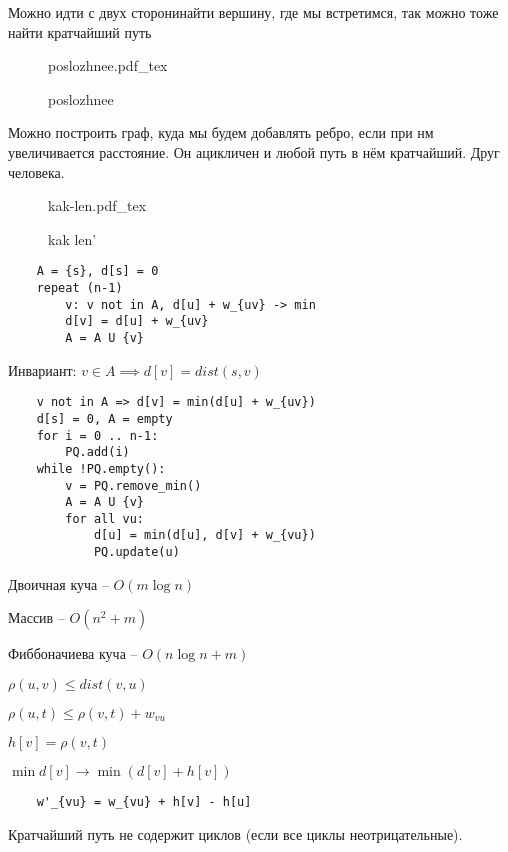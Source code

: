 \documentclass{book}
\theoremstyle{definition}
\newcommand{\incfig}[1]{%
    \def\svgwidth{\columnwidth}
    {#1.pdf_tex}
}
\begin{document}
Можно идти с двух сторонинайти вершину, где мы встретимся, так можно тоже найти кратчайший путь

\begin{figure}[!ht]
    \centering
    \incfig{poslozhnee}
    \caption{poslozhnee}
    \label{fig:poslozhnee}
\end{figure}

Можно построить граф, куда мы будем добавлять ребро, если при нм увеличивается расстояние. Он ацикличен и любой путь в нём кратчайший. Друг человека.

\begin{figure}[!ht]
    \centering
    \incfig{kak-len}
    \caption{kak len'}
    \label{fig:kak-len}
\end{figure}

\begin{lstlisting}
    A = {s}, d[s] = 0
    repeat (n-1)
        v: v not in A, d[u] + w_{uv} -> min
        d[v] = d[u] + w_{uv}
        A = A U {v}
\end{lstlisting}

Инвариант: $v\in A \implies  d[v] = dist(s,v)$

\begin{lstlisting}
    v not in A => d[v] = min(d[u] + w_{uv})
    d[s] = 0, A = empty
    for i = 0 .. n-1:
        PQ.add(i)
    while !PQ.empty():
        v = PQ.remove_min()
        A = A U {v}
        for all vu:
            d[u] = min(d[u], d[v] + w_{vu})
            PQ.update(u)
\end{lstlisting}

Двоичная куча -- $O\left( m\log n \right) $ 

Массив -- $O\left( n^2 + m \right) $

Фиббоначиева куча -- $O\left( n\log n + m\right) $

\begin{statement}
    [A*]

    $\rho(u,v) \leqslant dist(v,u)$

    $\rho(u,t) \leqslant  \rho(v,t) + w_{vu}$

    $h[v] = \rho(v,t)$

    $\min d[v] \to \min \left( d[v] + h[v] \right) $
\end{statement}

\begin{lstlisting}
    w'_{vu} = w_{vu} + h[v] - h[u]

\end{lstlisting}

\begin{statement}
    Кратчайший путь не содержит циклов (если все циклы неотрицательные).
\end{statement}
\end{document}
